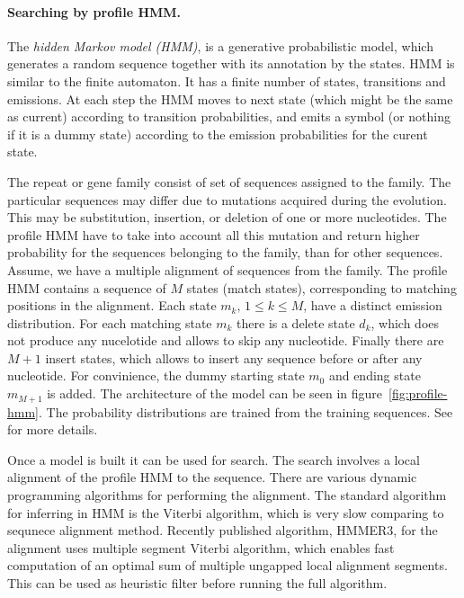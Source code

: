 \paragraph{Searching by profile HMM.}
The \emph{hidden Markov model (HMM)}, is a generative probabilistic model, which generates a random sequence together with its annotation by the states. HMM is similar to the finite automaton. It has a finite number of states, transitions and emissions. At each step the HMM moves to next state (which might be the same as current) according to transition probabilities, and emits a symbol (or nothing if it is a dummy state) according to the emission probabilities for the curent state.

The repeat or gene family consist of set of sequences assigned to the family. The particular sequences may differ due to mutations acquired during the evolution. This may be substitution, insertion, or deletion of one or more nucleotides. The profile HMM have to take into account all this mutation and return higher probability for the sequences belonging to the family, than for other sequences.
Assume, we have a multiple alignment of sequences from the family. The profile HMM\cite{profile-hmm} contains a sequence of $M$ states (match states), corresponding to matching positions in the alignment. Each state $m_k,\, 1 \leq k \leq M$, have a distinct emission distribution.
For each matching state $m_k$ there is a delete state $d_k$, which does not produce any nucelotide and allows to skip any nucleotide. Finally there are $M+1$ insert states, which allows to insert any sequence before or after any nucleotide. For convinience, the dummy starting state $m_0$ and ending state $m_{M+1}$ is added.
The architecture of the model can be seen in figure~\ref{fig:profile-hmm}. The probability distributions are trained from the training sequences. See~\cite{profile-hmm} for more details.

Once a model is built it can be used for search. The search involves a local alignment of the profile HMM to the sequence.
There are various dynamic programming algorithms for performing the alignment. The standard algorithm for inferring in HMM is the Viterbi algorithm, which is very slow comparing to sequnece alignment method\cite{eddy2011accelerated}. Recently published algorithm, HMMER3\cite{eddy2011accelerated}, for the alignment uses multiple segment Viterbi algorithm\cite{eddy2011accelerated}, which enables fast computation of an optimal sum of multiple ungapped local
alignment segments. This can be used as heuristic filter before running the full algorithm.

